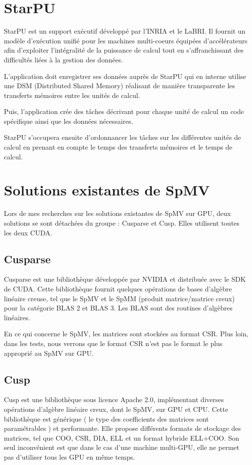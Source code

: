 \documentclass[a4paper,11pt]{report}
\begin{document}
 \section{StarPU}
  StarPU\cite{AugThiNamWac11CCPE} est un support exécutif développé par
  l'INRIA et le LaBRI. Il fournit un modèle d’exécution unifié pour les machines
  multi-coeurs équipées d'accélérateurs afin d’exploiter l’intégralité
  de la puissance de calcul tout en s’affranchissant des difficultés
  liées à la gestion des données.
  
  L'application doit enregistrer ses données auprès de StarPU qui en
  interne utilise une DSM (Distributed Shared Memory) réalisant de
  manière transparente les transferts mémoires entre les unités de calcul.

  Puis, l'application crée des tâches décrivant pour
  chaque unité de calcul un code spécifique ainsi que les données
  nécessaires. 

  StarPU s'occupera ensuite d'ordonnancer les tâches sur
  les différentes unités de calcul en prenant en compte le temps des
  transferts mémoires et le temps de calcul.

 \section{Solutions existantes de SpMV}
  Lors de mes recherches sur les solutions existantes de SpMV sur GPU,
  deux solutions se sont détachées du groupe : Cusparse et Cusp. Elles
  utilisent toutes les deux CUDA.
  
  \subsection{Cusparse}
   Cusparse\cite{cusparse11} est une bibliothèque développée par NVIDIA et distribuée
   avec le SDK de CUDA. Cette bibliothèque fournit quelques opérations
   de bases d'algèbre linéaire creuse, tel que le SpMV et le SpMM
   (produit matrice/matrice creux) pour
   la catégorie BLAS 2 et BLAS 3. Les BLAS sont des routines
   d'algèbres linéaires.

   En ce qui concerne le SpMV, les matrices sont stockées au format
   CSR. Plus loin, dans les tests, nous verrons que le format CSR n'est
   pas le format le plus approprié au SpMV sur GPU.
   
  \subsection{Cusp}
   Cusp\cite{Cusp}\cite{BeGa08cusp} est une bibliothèque sous licence Apache 2.0,
   implémentant diverses opérations d'algèbre linéaire creux, dont le
   SpMV, sur GPU et CPU. Cette bibliothèque est générique ( le type
   des coefficients des matrices sont paramétrables ) et
   performante. Elle propose différents formats de stockage
   des matrices, tel que COO, CSR, DIA, ELL et un format hybride
   ELL+COO. Son seul
   inconvénient est que dans le cas d'une machine multi-GPU,
   elle ne permet pas d'utiliser tous les GPU en même
   temps\cite{cuspNoMulti}.
\end{document}
